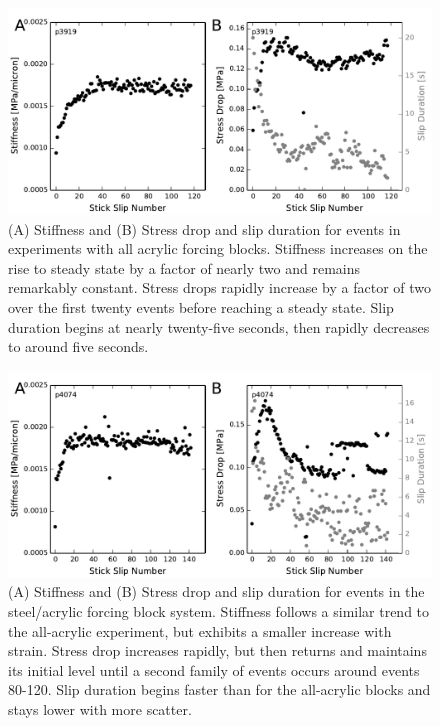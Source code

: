 \begin{figure}
\begin{centering}
\includegraphics[scale=0.8]{chap_granular_stiffness/Fig9.pdf}
\caption{\label{fig:p3919_picks}
(A) Stiffness and (B) Stress drop and slip duration for events in experiments with all acrylic forcing blocks.  Stiffness increases on the rise to steady state by a factor of nearly two and remains remarkably constant. Stress drops rapidly increase by a factor of two over the first twenty events before reaching a steady state.  Slip duration begins at nearly twenty-five seconds, then rapidly decreases to around five seconds.}
\end{centering}
\end{figure}

\clearpage

\begin{figure}
\begin{centering}
\includegraphics[scale=0.8]{chap_granular_stiffness/Fig10.pdf}
\caption{\label{fig:p4074_picks}
(A) Stiffness and (B) Stress drop and slip duration for events in the steel/acrylic forcing block system. Stiffness follows a similar trend to the all-acrylic experiment, but exhibits a smaller increase with strain. Stress drop increases rapidly, but then returns and maintains its initial level until a second family of events occurs around events 80-120.  Slip duration begins faster than for the all-acrylic blocks and stays lower with more scatter.  }
\end{centering}
\end{figure}

